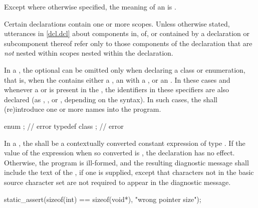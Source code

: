 \pnum
Except where otherwise specified, the meaning of an 
is .

\pnum
{}%
%
Certain declarations contain one or more scopes.
Unless otherwise stated, utterances in
\ref{dcl.dcl} about components in, of, or contained by a
declaration or subcomponent thereof refer only to those components of
the declaration that are \emph{not} nested within scopes nested within
the declaration.

\pnum
{}%
%
In a , the optional
 can be omitted only when declaring a
class or enumeration, that is,
when the  contains either a
, an  with
a , or an
. In these cases and whenever a
 or  is present in
the , the identifiers in these specifiers
are also declared (as
, , or
, depending on the syntax). In such cases,
the  shall (re)introduce one or more names into
the program.
\begin{example}
\begin{codeblock}
enum { };           // error
typedef class { };  // error
\end{codeblock}
\end{example}

\pnum
{}%
In a , the
 shall be
a contextually converted constant expression
of type .
If the value of the expression when
so converted is , the declaration has no
effect. Otherwise, the program is ill-formed, and the resulting
diagnostic message shall include the text of
the , if one is supplied,
except that characters not in the basic
source character set are not required to appear in
the diagnostic message.
\begin{example}
\begin{codeblock}
static_assert(sizeof(int) == sizeof(void*), "wrong pointer size");
\end{codeblock}
\end{example}

